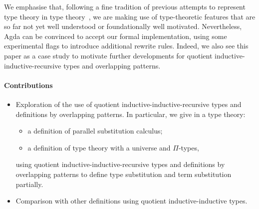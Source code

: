 \documentclass[a4paper,UKenglish,numberwithinsect,cleveref,thm-restate]{lipics-v2021}
\begin{document}

%
We emphasise that, following a fine tradition of previous attempts to represent type theory in type theory~\cite{Danielsson2006,Chapman2009,Altenkirch2016a}, we are making use of type-theoretic features that are so far not yet well understood or foundationally well motivated.
Nevertheless, Agda can be convinced to accept our formal implementation, using some experimental flags to introduce additional rewrite rules.
Indeed, we also see this paper as a case study to motivate further developments for quotient inductive-inductive-recursive types and overlapping patterns.

\paragraph*{Contributions}
\begin{itemize}
  \item Exploration of the use of quotient inductive-inductive-recursive types and definitions by overlapping patterns.
    In particular, we give in a type theory:
    \begin{itemize}
      \item a definition of parallel substitution calculus;
      \item a definition of type theory with a universe and $\Pi$-types,
    \end{itemize}
   using quotient inductive-inductive-recursive types and definitions by overlapping patterns to define type substitution and term substitution partially.
  \item Comparison with other definitions using quotient inductive-inductive types.
\end{itemize}
\end{document}
